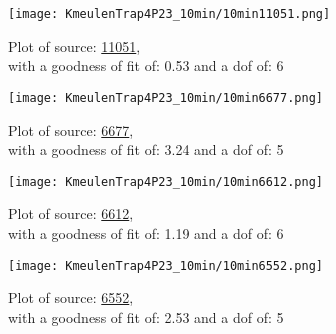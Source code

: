 \documentclass{article}
\begin{document}
\begin{figure}[H]
    \centering
    \begin{minipage}{.5\textwidth}
        \centering
        \texttt{[image: KmeulenTrap4P23\_10min/10min11051.png]}
        \captionsetup{labelformat=empty}
        \caption{Plot of source: \href{http://banana.transientskp.org/r4/vlo_KmeulenTrap4P23/runningcatalog/11051}{11051},\\with a goodness of fit of: 0.53 and a dof of: 6}
        \addtocounter{figure}{-1}
        \label{KmeulenTrap4P23:10min:11051:plot}
    \end{minipage}%
    \begin{minipage}{0.5\textwidth}
        \centering

        \texttt{[image: KmeulenTrap4P23\_10min/10min6677.png]}
        \captionsetup{labelformat=empty}
        \caption{Plot of source: \href{http://banana.transientskp.org/r4/vlo_KmeulenTrap4P23/runningcatalog/6677}{6677},\\with a goodness of fit of: 3.24 and a dof of: 5}
    \addtocounter{figure}{-1}
    \label{KmeulenTrap4P23:10min:6677:plot}
    \end{minipage}
\end{figure}
\begin{figure}[H]
    \centering
    \begin{minipage}{.5\textwidth}
        \centering
        \texttt{[image: KmeulenTrap4P23\_10min/10min6612.png]}
        \captionsetup{labelformat=empty}
        \caption{Plot of source: \href{http://banana.transientskp.org/r4/vlo_KmeulenTrap4P23/runningcatalog/6612}{6612},\\with a goodness of fit of: 1.19 and a dof of: 6}
        \addtocounter{figure}{-1}
        \label{KmeulenTrap4P23:10min:6612:plot}
    \end{minipage}%
    \begin{minipage}{0.5\textwidth}
        \centering

        \texttt{[image: KmeulenTrap4P23\_10min/10min6552.png]}
        \captionsetup{labelformat=empty}
        \caption{Plot of source: \href{http://banana.transientskp.org/r4/vlo_KmeulenTrap4P23/runningcatalog/6552}{6552},\\with a goodness of fit of: 2.53 and a dof of: 5}
    \addtocounter{figure}{-1}
    \label{KmeulenTrap4P23:10min:6552:plot}
    \end{minipage}
\end{figure}
\end{document}
